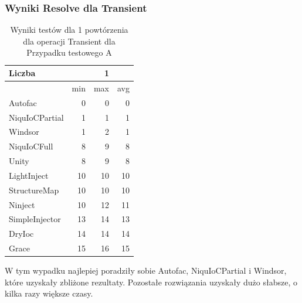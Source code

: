 \documentclass[12pt]{article}
\begin{document}
\subsubsection{Wyniki Resolve dla Transient}
\begin{table}[H]
\captionsetup{belowskip=0pt,aboveskip=0pt}
\begin{center}
\begin{small}
	\begin{tabular}{ | l | r r r | }
    		\hline
Liczba & & 1 & \\ \hline
 & min & max & avg \\ \hline
Autofac & 0 & 0 & 0 \\ \hline
NiquIoCPartial & 1 & 1 & 1 \\ \hline
Windsor & 1 & 2 & 1 \\ \hline
NiquIoCFull & 8 & 9 & 8 \\ \hline
Unity & 8 & 9 & 8 \\ \hline
LightInject & 10 & 10 & 10 \\ \hline
StructureMap & 10 & 10 & 10 \\ \hline
Ninject & 10 & 12 & 11 \\ \hline
SimpleInjector & 13 & 14 & 13 \\ \hline
DryIoc & 14 & 14 & 14 \\ \hline
Grace & 15 & 16 & 15 \\ \hline
  	\end{tabular}
\end{small}
\end{center}
\caption{Wyniki testów dla 1 powtórzenia dla operacji Transient dla Przypadku testowego A}
\label{TestCaseA_Transient1}
\end{table}
W tym wypadku najlepiej poradziły sobie Autofac, NiquIoCPartial i Windsor, które uzyskały zbliżone rezultaty. Pozostałe rozwiązania uzyskały dużo słabsze, o kilka razy większe czasy.
\\ \\
\end{document}
